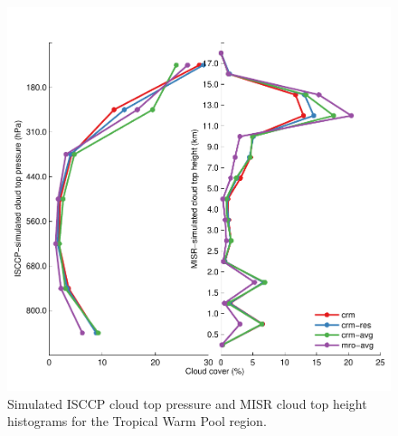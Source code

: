 \documentclass[letter]{article}
\begin{document}
\begin{figure}
\centering
\includegraphics{isccp-misr_cth.pdf}
\caption{Simulated ISCCP cloud top pressure and MISR cloud top height histograms for the Tropical Warm Pool region.}
\label{all_cth}
\end{figure}
\end{document}

